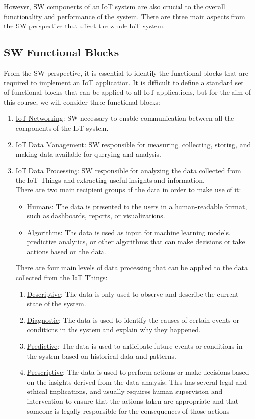 However, SW components of an IoT system are also crucial to the overall functionality and performance of the system. There are three main aspects from the SW perspective that affect the whole IoT system.

\subsection{SW Functional Blocks}\label{sec:SWBlocks}

From the SW perspective, it is essential to identify the functional blocks that are required to implement an IoT application. It is difficult to define a standard set of functional blocks that can be applied to all IoT applications, but for the aim of this course, we will consider three functional blocks:
\begin{enumerate}
    \item \ul{IoT Networking}: SW necessary to enable communication between all the components of the IoT system.
    \item \ul{IoT Data Management}: SW responsible for measuring, collecting, storing, and making data available for querying and analysis.
    \item \ul{IoT Data Processing}: SW responsible for analyzing the data collected from the IoT Things and extracting useful insights and information.\\
    
    There are two main recipient groups of the data in order to make use of it:
    \begin{itemize}
        \item Humans: The data is presented to the users in a human-readable format, such as dashboards, reports, or visualizations.
        \item Algorithms: The data is used as input for machine learning models, predictive analytics, or other algorithms that can make decisions or take actions based on the data.
    \end{itemize}

    There are four main levels of data processing that can be applied to the data collected from the IoT Things:
    \begin{enumerate}
        \item \ul{Descriptive}: The data is only used to observe and describe the current state of the system.
        \item \ul{Diagnostic}: The data is used to identify the causes of certain events or conditions in the system and explain why they happened.
        \item \ul{Predictive}: The data is used to anticipate future events or conditions in the system based on historical data and patterns.
        \item \ul{Prescriptive}: The data is used to perform actions or make decisions based on the insights derived from the data analysis. This has several legal and ethical implications, and usually requires human supervision and intervention to ensure that the actions taken are appropriate and that someone is legally responsible for the consequences of those actions.
    \end{enumerate}
\end{enumerate}

